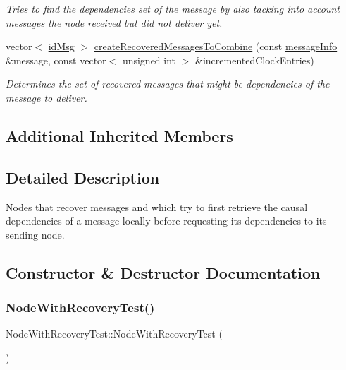 \begin{DoxyCompactItemize}
\begin{DoxyCompactList}\small\item\em Tries to find the dependencies set of the message by also tacking into account messages the node received but did not deliver yet. \end{DoxyCompactList}\item 
vector$<$ \hyperlink{structures_8h_a83a1d9a070efa5341da84cfd8e28d3e5}{id\+Msg} $>$ \hyperlink{class_node_with_recovery_test_aa6b94e1bff36f3ec804d4ba136de96b8}{create\+Recovered\+Messages\+To\+Combine} (const \hyperlink{structures_8h_a7e7bdc1d2fff8a9436f2f352b2711ed6}{message\+Info} \&message, const vector$<$ unsigned int $>$ \&incremented\+Clock\+Entries)
\begin{DoxyCompactList}\small\item\em Determines the set of recovered messages that might be dependencies of the message to deliver. \end{DoxyCompactList}\end{DoxyCompactItemize}
\subsection*{Additional Inherited Members}


\subsection{Detailed Description}
Nodes that recover messages and which try to first retrieve the causal dependencies of a message locally before requesting its dependencies to its sending node. 



\subsection{Constructor \& Destructor Documentation}
\mbox{\label{class_node_with_recovery_test_ae8676a479a3ad761eb6cd5069575f51f}} 
\subsubsection{\texorpdfstring{Node\+With\+Recovery\+Test()}{NodeWithRecoveryTest()}}
{\footnotesize\ttfamily Node\+With\+Recovery\+Test\+::\+Node\+With\+Recovery\+Test (\begin{DoxyParamCaption}{ }\end{DoxyParamCaption})}

